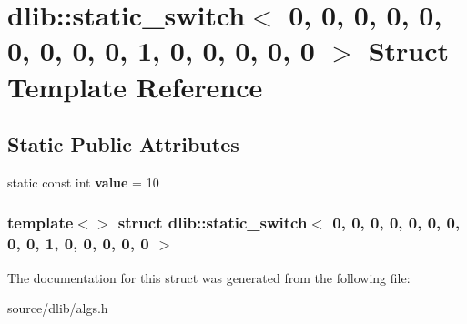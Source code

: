 \hypertarget{structdlib_1_1static__switch_3_010_00_010_00_010_00_010_00_010_00_010_00_010_00_010_00_010_00_011e8c10a795cabaf3f5d590d7d2ed509c}{
\section{dlib::static\_\-switch$<$ 0, 0, 0, 0, 0, 0, 0, 0, 0, 1, 0, 0, 0, 0, 0 $>$ Struct Template Reference}
\label{structdlib_1_1static__switch_3_010_00_010_00_010_00_010_00_010_00_010_00_010_00_010_00_010_00_011e8c10a795cabaf3f5d590d7d2ed509c}
}
\subsection*{Static Public Attributes}
\begin{DoxyCompactItemize}
\item 
\hypertarget{structdlib_1_1static__switch_3_010_00_010_00_010_00_010_00_010_00_010_00_010_00_010_00_010_00_011e8c10a795cabaf3f5d590d7d2ed509c_a391ff2a5c1e86a76962e16163ef7deff}{
static const int {\bfseries value} = 10}
\label{structdlib_1_1static__switch_3_010_00_010_00_010_00_010_00_010_00_010_00_010_00_010_00_010_00_011e8c10a795cabaf3f5d590d7d2ed509c_a391ff2a5c1e86a76962e16163ef7deff}

\end{DoxyCompactItemize}
\subsubsection*{template$<$$>$ struct dlib::static\_\-switch$<$ 0, 0, 0, 0, 0, 0, 0, 0, 0, 1, 0, 0, 0, 0, 0 $>$}



The documentation for this struct was generated from the following file:\begin{DoxyCompactItemize}
\item 
source/dlib/algs.h\end{DoxyCompactItemize}
